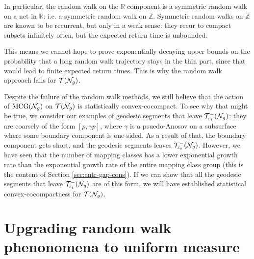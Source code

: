 In particular, the random walk on the $\mathbb{R}$ component is a symmetric random walk on a net in $\mathbb{R}$: i.e. a symmetric random walk on $\mathbb{Z}$.
Symmetric random walks on $\mathbb{Z}$ are known to be recurrent, but only in a weak sense: they recur to compact subsets infinitely often, but the expected return time is unbounded.

This means we cannot hope to prove exponentially decaying upper bounds on the probability that a long random walk trajectory stays in the thin part, since that would lead to finite expected return times.
This is why the random walk approach fails for $\mathcal{T}(\mathcal{N}_g)$.

Despite the failure of the random walk methods, we still believe that the action of $\mathrm{MCG}(\mathcal{N}_g)$ on $\mathcal{T}(\mathcal{N}_g)$ is statistically convex-cocompact.
To see why that might be true, we consider our examples of geodesic segments that leave $\mathcal{T}_{\varepsilon_t}^{-}(\mathcal{N}_g)$: they are coarsely of the form $[p, \gamma p]$, where $\gamma$ is a psuedo-Anosov on a subsurface where some boundary component is one-sided.
As a result of that, the boundary component gets short, and the geodesic segments leaves $\mathcal{T}_{\varepsilon_t}^{-}(\mathcal{N}_g)$.
However, we have seen that the number of mapping classes has a lower exponential growth rate than the exponential growth rate of the entire mapping class group (this is the content of Section \ref{sec:entr-gap-cons}).
If we can show that all the geodesic segments that leave $\mathcal{T}_{\varepsilon_t}^{-}(\mathcal{N}_g)$ are of this form, we will have established statistical convex-cocompactness for $\mathcal{T}(\mathcal{N}_g)$.

\section{Upgrading random walk phenonomena to uniform measure}
\label{sec:upgr-rand-walk}



